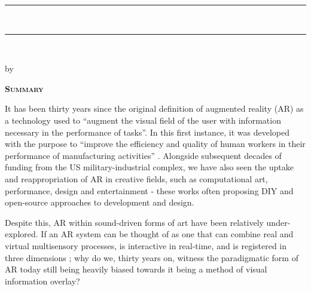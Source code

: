 
\thispagestyle{empty}

 \begin{center}

    {\rule{\linewidth}{1pt}\\%
    \Large \myTitle \par %
    \normalsize \mySubtitle \par}
    \rule{\linewidth}{1pt}\\[0.4cm]
    
	{\normalsize by \myName \par} %
 \end{center}

    {\noindent\Huge\textsc{\textbf{Summary}} \par}

    \noindent It has been thirty years since the original definition of augmented reality (AR) as a technology used to ``augment the visual field of the user with information necessary in the performance of tasks''. In this first instance, it was developed with the purpose to ``improve the efficiency and quality of human workers in their performance of manufacturing activities'' \citep{caudell1992}. Alongside subsequent decades of funding from the US military-industrial complex, we have also seen the uptake and reappropriation of AR in creative fields, such as computational art, performance, design and entertainment - these works often proposing DIY and open-source approaches to development and design. 
    
    \noindent Despite this, AR within sound-driven forms of art have been relatively under-explored. If an AR system can be thought of as one that can combine real and virtual multisensory processes, is interactive in real-time, and is registered in three dimensions \citep{azuma1997}; why do we, thirty years on, witness the paradigmatic form of AR today still being heavily biased \citep{billinghurst2015} towards it being a method of visual information overlay?
    
